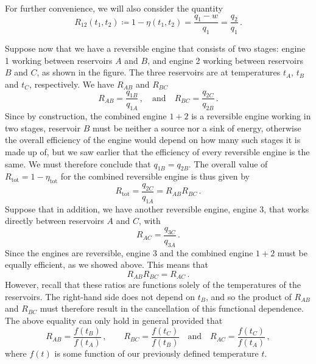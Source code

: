 \documentclass{article}
\theoremstyle{plain}\theoremheaderfont{\normalfont\bfseries}\theorembodyfont{\rmfamily}\theoremseparator{.}\newtheorem*{thm}{Theorem}\newtheorem*{law}{Law}\newtheorem*{pos}{Postulate}
\numberwithin{equation}{section}
\begin{document}
    For further convenience, we will also consider the quantity
    \begin{equation}
        R_{12}(t_1,t_2)\coloneqq 1-\eta(t_1,t_2)=\frac{q_1-w}{q_1}=\frac{q_2}{q_1}\,.
    \end{equation}

    Suppose now that we have a reversible engine that consists of two stages: engine 1 working between reservoirs \(A\) and \(B\), and engine 2 working between reservoirs \(B\) and \(C\), as shown in the figure. The three reservoirs are at temperatures \(t_A\), \(t_B\) and \(t_C\), respectively. We have \(R_{AB}\) and \(R_{BC}\)
    \[R_{AB}=\frac{q_{1B}}{q_{1A}}\,,\quad\text{and}\quad R_{BC}=\frac{q_{2C}}{q_{2B}}\,.\]
    Since by construction, the combined engine \(1+2\) is a reversible engine working in two stages, reservoir \(B\) must be neither a source nor a sink of energy, otherwise the overall efficiency of the engine would depend on how many such stages it is made up of, but we saw earlier that the efficiency of every reversible engine is the same. We must therefore conclude that \(q_{1B}=q_{2B}\). The overall value of \(R_{\text{tot}}=1-\eta_{\text{tot}}\) for the combined reversible engine is thus given by
    \begin{equation}
        R_{\text{tot}}=\frac{q_{2C}}{q_{1A}}=R_{AB}R_{BC}\,.
    \end{equation}
    Suppose that in addition, we have another reversible engine, engine 3, that works directly between reservoirs \(A\) and \(C\), with
    \begin{equation}
        R_{AC}=\frac{q_{3C}}{q_{3A}}\,.
    \end{equation}
    Since the engines are reversible, engine 3 and the combined engine \(1+2\) must be equally efficient, as we showed above. This means that
    \begin{equation}
        R_{AB}R_{BC}=R_{AC}\,.
    \end{equation}
    However, recall that these ratios are functions solely of the temperatures of the reservoirs. The right-hand side does not depend on \(t_B\), and so the product of \(R_{AB}\) and \(R_{BC}\) must therefore result in the cancellation of this functional dependence. The above equality can only hold in general provided that
    \begin{equation}
        R_{AB}=\frac{f(t_B)}{f(t_A)}\,,\qquad R_{BC}=\frac{f(t_C)}{f(t_B)}\quad\text{and}\quad R_{AC}=\frac{f(t_C)}{f(t_A)}\,,
    \end{equation}
    where \(f(t)\) is some function of our previously defined temperature \(t\).
\end{document}
